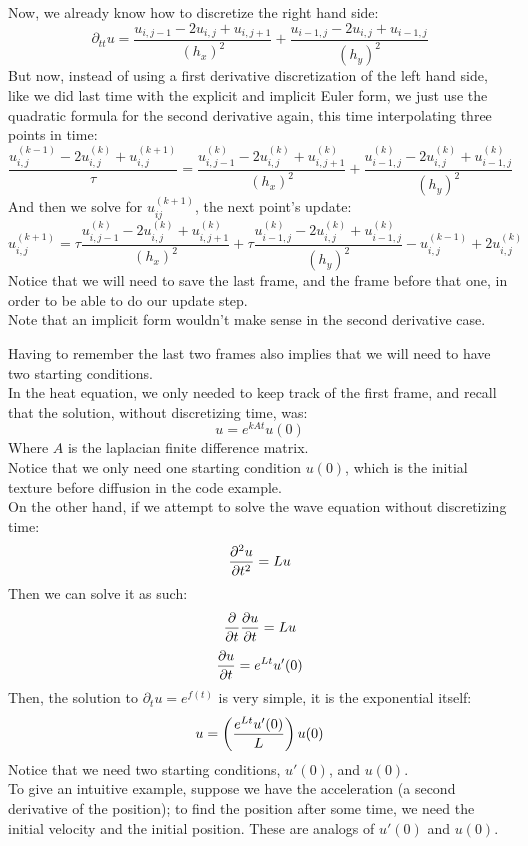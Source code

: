 \documentclass[12pt]{article}
\begin{document}
Now, we already know how to discretize the right hand
side:
\[ \partial_{tt}u = \dfrac{u_{i, j-1}-2u_{i, j}
+u_{i, j+1}}{(h_x)^2} + \dfrac{u_{i-1, j}-2u_{i, j}
+u_{i-1, j}}{(h_y)^2} \]
But now, instead of using a first derivative discretization
of the left hand side, like we did last time with
the explicit and implicit Euler form,
we just use the quadratic formula for the second derivative
again, this time interpolating three points in time:
\[ \dfrac{u^{(k-1)}_{i, j}-2u^{(k)}_{i, j}
+u^{(k+1)}_{i, j}}{\tau} = \dfrac{u^{(k)}_{i, j-1}
-2u^{(k)}_{i, j} +u^{(k)}_{i, j+1}}{(h_x)^2} 
+ \dfrac{u^{(k)}_{i-1, j}-2u^{(k)}_{i, j} 
+ u^{(k)}_{i-1, j}}{(h_y)^2} \]
And then we solve for $u^{(k+1)}_{ij}$, the
next point's update:
\[ u^{(k+1)}_{i, j}= \tau\dfrac{u^{(k)}_{i, j-1}
-2u^{(k)}_{i, j} +u^{(k)}_{i, j+1}}{(h_x)^2} 
+ \tau\dfrac{u^{(k)}_{i-1, j}-2u^{(k)}_{i, j} 
+ u^{(k)}_{i-1, j}}{(h_y)^2}
-u^{(k-1)}_{i, j} + 2u^{(k)}_{i, j} \]
Notice that we will need to save the last frame,
and the frame before that one, in order to be able
to do our update step. \\

Note that an implicit form wouldn't make sense
in the second derivative case.


Having to remember the last two frames also implies
that we will need to have two starting conditions. \\
In the heat equation, we only needed to keep track
of the first frame, and recall that the solution,
without discretizing time, was:
\[ u = e^{kAt}u(0) \]
Where $A$ is the laplacian finite difference matrix. \\
Notice that we only need one starting condition $u(0)$,
which is the initial texture before diffusion in the
code example. \\

On the other hand, if we attempt to solve 
the wave equation without discretizing time:
\[ \dfrac{\partial ^2u}{\partial t^2} = Lu \]
Then we can solve it as such:
\[ \dfrac{\partial }{\partial t}\dfrac{\partial u}{\partial t} = Lu \]
\[ \dfrac{\partial u}{\partial t} = e^{Lt}u'(0) \]
Then, the solution to $\partial_t u = e^{f(t)}$
is very simple, it is the exponential itself:
\[ u = \left( \dfrac{e^{Lt}u'(0)}{L} \right)u(0) \]
Notice that we need two starting conditions, 
$u'(0)$, and $u(0)$. \\

To give an intuitive example, suppose we have
the acceleration (a second derivative 
of the position); to find the position after some time,
we need the initial velocity and the initial position.
These are analogs of $u'(0)$ and $u(0)$. \\
\end{document}

